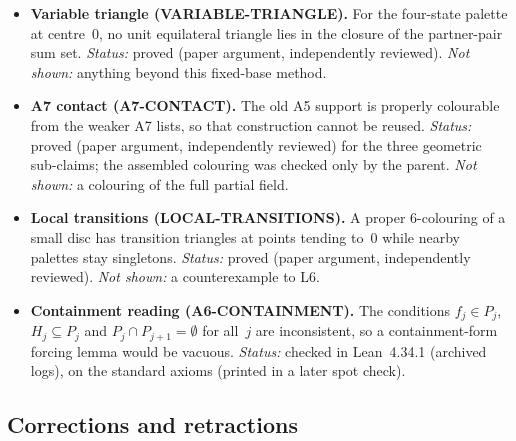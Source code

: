 \documentclass[11pt]{article}
\theoremstyle{definition}
\theoremstyle{remark}
\begin{document}
\begin{itemize}
\item \textbf{Variable triangle (VARIABLE-TRIANGLE).} For the four-state
palette at centre~0, no unit equilateral triangle lies in the closure of the
partner-pair sum set. \emph{Status:} proved (paper argument, independently
reviewed). \emph{Not shown:} anything beyond this fixed-base method.

\item \textbf{A7 contact (A7-CONTACT).} The old A5 support is properly
colourable from the weaker A7 lists, so that construction cannot be reused.
\emph{Status:} proved (paper argument, independently reviewed) for the three
geometric sub-claims; the assembled colouring was checked only by the parent.
\emph{Not shown:} a colouring of the full partial field.

\item \textbf{Local transitions (LOCAL-TRANSITIONS).} A proper 6-colouring of
a small disc has transition triangles at points tending to~0 while nearby
palettes stay singletons. \emph{Status:} proved (paper argument,
independently reviewed). \emph{Not shown:} a counterexample to L6.

\item \textbf{Containment reading (A6-CONTAINMENT).} The conditions
$f_j\in P_j$, $H_j\subseteq P_j$ and $P_j\cap P_{j+1}=\emptyset$ for all~$j$
are inconsistent, so a containment-form forcing lemma would be vacuous.
\emph{Status:} checked in Lean~4.34.1 (archived logs), on the standard
axioms (printed in a later spot check).
\end{itemize}

\subsection{Corrections and retractions}
\end{document}

